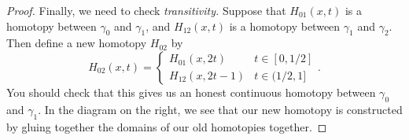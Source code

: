 \begin{doubledtuftepage}
\begin{proof}
Finally, we need to check\emph{ transitivity.} Suppose that $H_{01}(x,  t)$ is a homotopy between $\gamma_0$ and $\gamma_1$,  and $H_{12}(x,  t)$ is a homotopy between $\gamma_1$ and $\gamma_2$. Then define a new homotopy $H_{02}$ by 
		\[
			H_{02}(x,  t)=\left\{\begin{array}{cc}
			                     	H_{01}(x, 2t) & t\in [0, 1/2]\\
			                     	H_{12}(x, 2t-1) & t\in (1/2,  1]
			                     \end{array}\right. .
		\]
		You should check that this gives us an honest continuous homotopy between $\gamma_0$ and $\gamma_1$. In the diagram on the right, we see that our new homotopy is constructed by gluing together the domains of our old homotopies together. 

\end{proof}


\end{doubledtuftepage}

